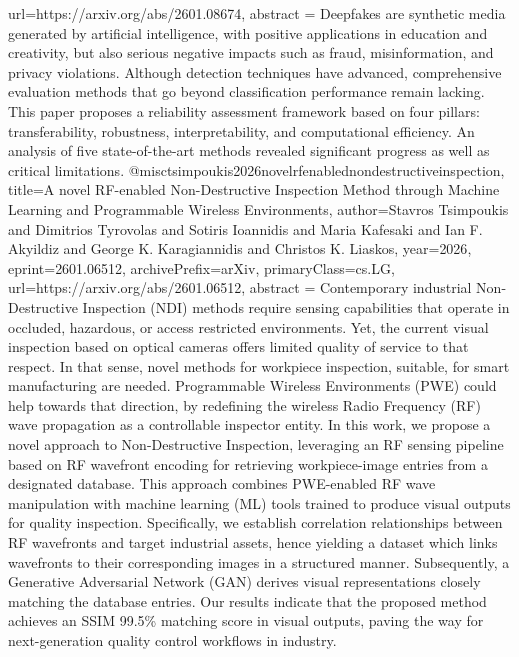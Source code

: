 {      url={https://arxiv.org/abs/2601.08674},
      abstract = {Deepfakes are synthetic media generated by artificial intelligence, with positive applications in education and creativity, but also serious negative impacts such as fraud, misinformation, and privacy violations. Although detection techniques have advanced, comprehensive evaluation methods that go beyond classification performance remain lacking. This paper proposes a reliability assessment framework based on four pillars: transferability, robustness, interpretability, and computational efficiency. An analysis of five state-of-the-art methods revealed significant progress as well as critical limitations.}
}@misc{tsimpoukis2026novelrfenablednondestructiveinspection,
      title={A novel RF-enabled Non-Destructive Inspection Method through Machine Learning and Programmable Wireless Environments}, 
      author={Stavros Tsimpoukis and Dimitrios Tyrovolas and Sotiris Ioannidis and Maria Kafesaki and Ian F. Akyildiz and George K. Karagiannidis and Christos K. Liaskos},
      year={2026},
      eprint={2601.06512},
      archivePrefix={arXiv},
      primaryClass={cs.LG},
      url={https://arxiv.org/abs/2601.06512},
      abstract = {Contemporary industrial Non-Destructive Inspection (NDI) methods require sensing capabilities that operate in occluded, hazardous, or access restricted environments. Yet, the current visual inspection based on optical cameras offers limited quality of service to that respect. In that sense, novel methods for workpiece inspection, suitable, for smart manufacturing are needed. Programmable Wireless Environments (PWE) could help towards that direction, by redefining the wireless Radio Frequency (RF) wave propagation as a controllable inspector entity. In this work, we propose a novel approach to Non-Destructive Inspection, leveraging an RF sensing pipeline based on RF wavefront encoding for retrieving workpiece-image entries from a designated database. This approach combines PWE-enabled RF wave manipulation with machine learning (ML) tools trained to produce visual outputs for quality inspection. Specifically, we establish correlation relationships between RF wavefronts and target industrial assets, hence yielding a dataset which links wavefronts to their corresponding images in a structured manner. Subsequently, a Generative Adversarial Network (GAN) derives visual representations closely matching the database entries. Our results indicate that the proposed method achieves an SSIM 99.5\% matching score in visual outputs, paving the way for next-generation quality control workflows in industry.}
}

